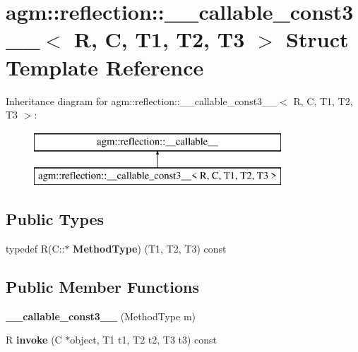 \hypertarget{structagm_1_1reflection_1_1____callable__const3____}{}\section{agm\+:\+:reflection\+:\+:\+\_\+\+\_\+callable\+\_\+const3\+\_\+\+\_\+$<$ R, C, T1, T2, T3 $>$ Struct Template Reference}
\label{structagm_1_1reflection_1_1____callable__const3____}
Inheritance diagram for agm\+:\+:reflection\+:\+:\+\_\+\+\_\+callable\+\_\+const3\+\_\+\+\_\+$<$ R, C, T1, T2, T3 $>$\+:\begin{figure}[H]
\begin{center}
\leavevmode
\includegraphics[height=2.000000cm]{structagm_1_1reflection_1_1____callable__const3____}
\end{center}
\end{figure}
\subsection*{Public Types}
\begin{DoxyCompactItemize}
\item 
typedef R(C\+::$\ast$ {\bfseries Method\+Type}) (T1, T2, T3) const \hypertarget{structagm_1_1reflection_1_1____callable__const3_____a5824c75fd200678adeb15cb77fb18169}{}\label{structagm_1_1reflection_1_1____callable__const3_____a5824c75fd200678adeb15cb77fb18169}

\end{DoxyCompactItemize}
\subsection*{Public Member Functions}
\begin{DoxyCompactItemize}
\item 
{\bfseries \+\_\+\+\_\+callable\+\_\+const3\+\_\+\+\_\+} (Method\+Type m)\hypertarget{structagm_1_1reflection_1_1____callable__const3_____a6751f49f22d5dc94d0cd0d328a89e8a7}{}\label{structagm_1_1reflection_1_1____callable__const3_____a6751f49f22d5dc94d0cd0d328a89e8a7}

\item 
R {\bfseries invoke} (C $\ast$object, T1 t1, T2 t2, T3 t3) const \hypertarget{structagm_1_1reflection_1_1____callable__const3_____a6dc6ae9fd1e869fbd33d96bc4ce304d4}{}\label{structagm_1_1reflection_1_1____callable__const3_____a6dc6ae9fd1e869fbd33d96bc4ce304d4}

\end{DoxyCompactItemize}
